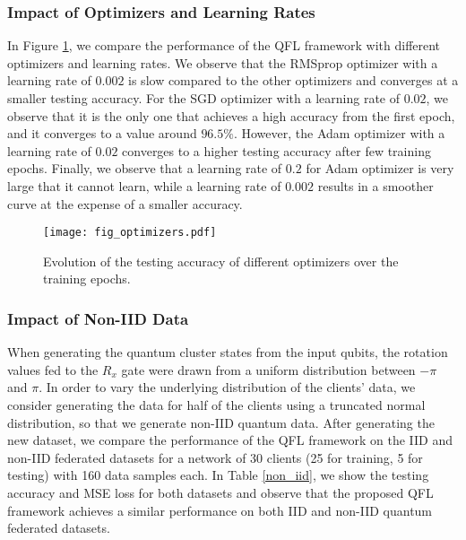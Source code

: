 \documentclass{article}
\begin{document}
\subsubsection{Impact of Optimizers and Learning Rates}\label{sec_optimizers}
In Figure \ref{fig_different_optimizers}, we compare the performance of the QFL framework with different optimizers and learning rates. We observe that the RMSprop optimizer with a learning rate of $0.002$ is slow compared to the other optimizers and converges at a smaller testing accuracy. For the SGD optimizer with a learning rate of $0.02$, we observe that it is the only one that achieves a high accuracy from the first epoch, and it converges to a value around $96.5\%$. However, the Adam optimizer with a learning rate of $0.02$ converges to a higher testing accuracy after few training epochs. Finally, we observe that a learning rate of $0.2$ for Adam optimizer is very large that it cannot learn, while a learning rate of $0.002$ results in a smoother curve at the expense of a smaller accuracy.

\begin{figure}[ht]
  \begin{center}
    \texttt{[image: fig\_optimizers.pdf]}
    \caption{Evolution of the testing accuracy of different optimizers over the training epochs.}\label{fig_different_optimizers}
  \end{center}
  \vspace{-0.15in}
\end{figure}



\subsubsection{Impact of Non-IID Data}
When generating the quantum cluster states from the input qubits, the rotation values fed to the $R_x$ gate were drawn from a uniform distribution between $-\pi$ and $\pi$. In order to vary the underlying distribution of the clients' data, we consider generating the data for half of the clients using a truncated normal distribution, so that we generate non-IID quantum data. After generating the new dataset, we compare the performance of the QFL framework on the IID and non-IID federated datasets for a network of 30 clients (25 for training, 5 for testing) with 160 data samples each. In Table \ref{non_iid}, we show the testing accuracy and MSE loss for both datasets and observe that the proposed QFL framework achieves a similar performance on both IID and non-IID quantum federated datasets.
\end{document}
